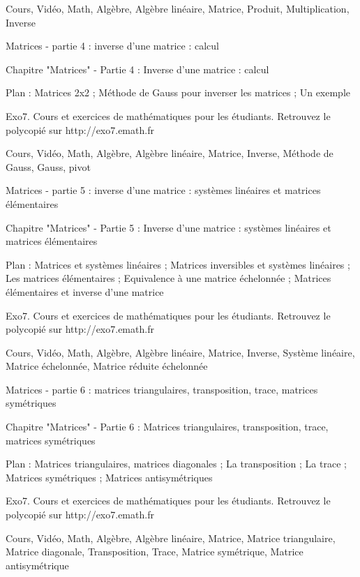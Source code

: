 Cours, Vidéo, Math, Algèbre, Algèbre linéaire, Matrice, Produit, Multiplication, Inverse



Matrices - partie 4 : inverse d'une matrice : calcul



Chapitre "Matrices" - Partie 4 : Inverse d'une matrice : calcul

Plan : Matrices 2x2 ; Méthode de Gauss pour inverser les matrices ;
Un exemple

Exo7. Cours et exercices de mathématiques pour les étudiants.
Retrouvez le polycopié sur http://exo7.emath.fr


Cours, Vidéo, Math, Algèbre, Algèbre linéaire, Matrice, Inverse, Méthode de Gauss, Gauss,
pivot



Matrices - partie 5 : inverse d'une matrice : systèmes linéaires et matrices élémentaires



Chapitre "Matrices" - Partie 5 : Inverse d'une matrice : systèmes linéaires et matrices élémentaires

Plan : Matrices et systèmes linéaires ; Matrices inversibles et systèmes linéaires ;
Les matrices élémentaires ; Equivalence à une matrice échelonnée ; 
Matrices élémentaires et inverse d'une matrice

Exo7. Cours et exercices de mathématiques pour les étudiants.
Retrouvez le polycopié sur http://exo7.emath.fr


Cours, Vidéo, Math, Algèbre, Algèbre linéaire, Matrice, Inverse, Système linéaire, Matrice échelonnée,
Matrice réduite échelonnée



Matrices - partie 6 : matrices triangulaires, transposition, trace, matrices symétriques



Chapitre "Matrices" - Partie 6 : Matrices triangulaires, transposition, trace, matrices symétriques

Plan : Matrices triangulaires, matrices diagonales ; La transposition ;
La trace ; Matrices symétriques ; Matrices antisymétriques

Exo7. Cours et exercices de mathématiques pour les étudiants.
Retrouvez le polycopié sur http://exo7.emath.fr


Cours, Vidéo, Math, Algèbre, Algèbre linéaire, Matrice, Matrice triangulaire, Matrice diagonale,
Transposition, Trace, Matrice symétrique, Matrice antisymétrique

